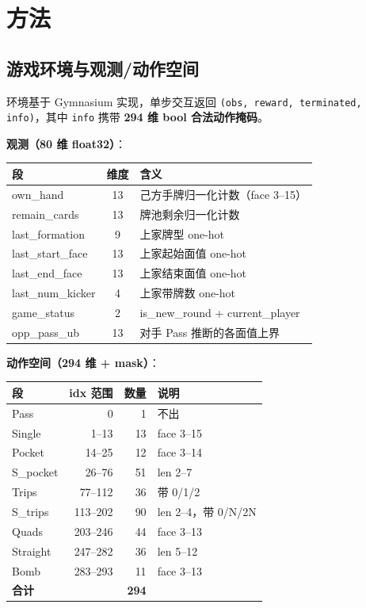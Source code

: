 \documentclass[twocolumn,a4paper,10pt]{ctexart}
\begin{document}
\section{方法}

\subsection{游戏环境与观测/动作空间}

环境基于 Gymnasium 实现，单步交互返回 \texttt{(obs, reward, terminated, info)}，其中 \texttt{info} 携带 \textbf{294 维 bool 合法动作掩码}。

\textbf{观测（80 维 float32）}：

{\small
\begin{tabularx}{\columnwidth}{@{}l c X@{}}
\toprule
段 & 维度 & 含义 \\
\midrule
own\_hand          & 13 & 己方手牌归一化计数（face 3--15） \\
remain\_cards      & 13 & 牌池剩余归一化计数 \\
last\_formation    &  9 & 上家牌型 one-hot \\
last\_start\_face  & 13 & 上家起始面值 one-hot \\
last\_end\_face    & 13 & 上家结束面值 one-hot \\
last\_num\_kicker  &  4 & 上家带牌数 one-hot \\
game\_status       &  2 & is\_new\_round + current\_player \\
opp\_pass\_ub      & 13 & 对手 Pass 推断的各面值上界 \\
\bottomrule
\end{tabularx}}

\textbf{动作空间（294 维 + mask）}：

{\small
\begin{tabularx}{\columnwidth}{@{}l r r X@{}}
\toprule
段 & idx 范围 & 数量 & 说明 \\
\midrule
Pass         & 0       &  1 & 不出 \\
Single       & 1--13   & 13 & face 3--15 \\
Pocket       & 14--25  & 12 & face 3--14 \\
S\_pocket    & 26--76  & 51 & len 2--7 \\
Trips        & 77--112 & 36 & 带 0/1/2 \\
S\_trips     & 113--202& 90 & len 2--4，带 0/N/2N \\
Quads        & 203--246& 44 & face 3--13 \\
Straight     & 247--282& 36 & len 5--12 \\
Bomb         & 283--293& 11 & face 3--13 \\
\midrule
\textbf{合计} & & \textbf{294} & \\
\bottomrule
\end{tabularx}}
\end{document}

